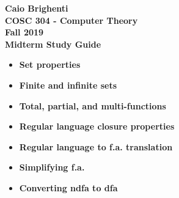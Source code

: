 \documentclass{article}
\begin{document}
\noindent \textbf{Caio Brighenti }\\
\noindent \textbf{COSC 304 - Computer Theory}\\%
\noindent \textbf{Fall 2019}\\%
\noindent \textbf{Midterm Study Guide}\vspace{1em}\\
\begin{itemize}
	\item \textbf{Set properties}
	\item \textbf{Finite and infinite sets}
	\item \textbf{Total, partial, and multi-functions}
	\item \textbf{Regular language closure properties}
	\item \textbf{Regular language to f.a. translation}
	\item \textbf{Simplifying f.a.}
	\item \textbf{Converting ndfa to dfa}
\end{itemize}
	
\end{document}
